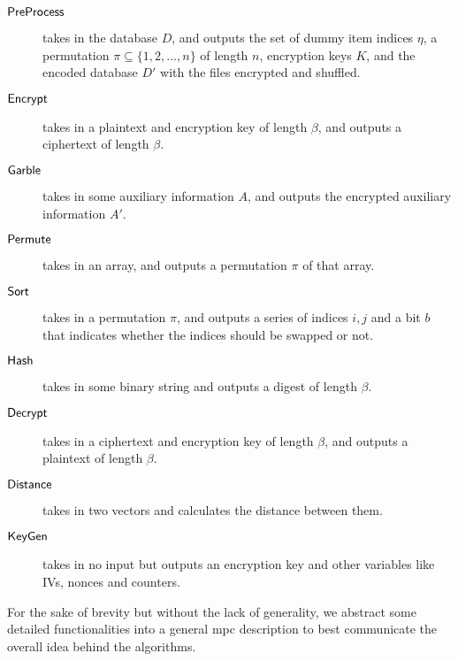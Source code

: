 \begin{description}
    \item[$ \mathsf{{PreProcess}} $] takes in the database $ D $, and outputs the set of dummy item indices $ \eta $, a permutation $ \pi \subseteq {\lbrace 1, 2, ... , n \rbrace} $ of length $ n $, encryption keys $ K $, and the encoded database $ D' $ with the files encrypted and shuffled.
    \item[$ \mathsf{{Encrypt}} $] takes in a plaintext and encryption key of length $ \beta $, and outputs a ciphertext of length $ \beta $.
    \item[$ \mathsf{{Garble}} $] takes in some auxiliary information $ A $, and outputs the encrypted auxiliary information $ A' $.
    \item[$ \mathsf{{Permute}} $] takes in an array, and outputs a permutation $ \pi $ of that array.
    \item[$ \mathsf{{Sort}} $] takes in a permutation $ \pi $, and outputs a series of indices $ i, j $ and a bit $ b $ that indicates whether the indices should be swapped or not.
    \item[$ \mathsf{Hash} $] takes in some binary string and outputs a digest of length $ \beta $.
    \item[$ \mathsf{{Decrypt}} $] takes in a ciphertext and encryption key of length $ \beta $, and outputs a plaintext of length $ \beta $.
    \item[$ \mathsf{{Distance}} $] takes in two vectors and calculates the distance between them. 
    \item[$ \mathsf{{KeyGen}} $] takes in no input but outputs an encryption key and other variables like IVs, nonces and counters.
\end{description}

For the sake of brevity but without the lack of generality, we abstract some detailed functionalities into a general \acrshort{mpc} description to best communicate the overall idea behind the algorithms.
